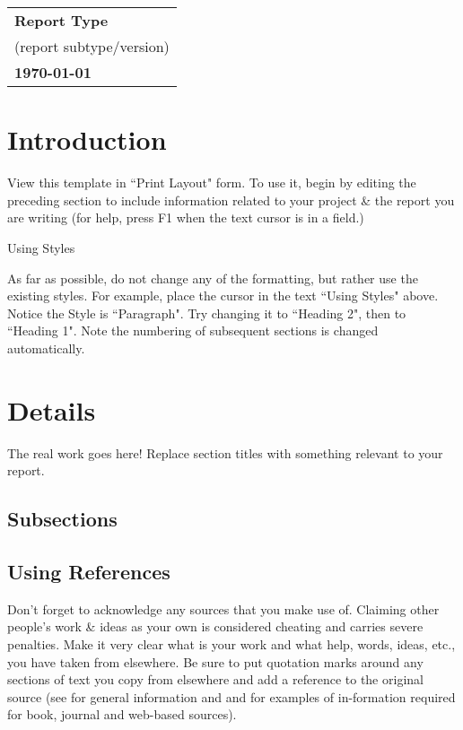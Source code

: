 \documentclass[a4paper, 12pt]{article}
\begin{document}
    \begin{table}[h!]
        \renewcommand{\arraystretch}{1.5}
        \centering
        \begin{tabular}{ |>{\centering\arraybackslash}m{15.15cm}| }
            \hline
            \Large \textbf{Report Type} \\
            \small (report subtype/version) \\
            \small \textbf{\today} \\
            \hline
        \end{tabular}
    \end{table}
    
    
    \section{Introduction}
    
    View this template in ``Print Layout" form. To use it, begin by editing 
    the preceding section to include information related to your project \& 
    the report you are writing (for help, press F1 when the text cursor is 
    in a field.) 
    
    Using Styles
    
    As far as possible, do not change any of the formatting, but rather use the 
    existing styles. For example, place the cursor in the text ``Using Styles" 
    above. Notice the Style is ``Paragraph". Try changing it to ``Heading 2", then to 
    ``Heading 1". Note the numbering of subsequent sections is changed automatically.
    
    \section{Details}
    
    The real work goes here! Replace section titles with something relevant to your report.
    
    \subsection{Subsections}
    
    \subsection{Using References}
    
    Don’t forget to acknowledge any sources that you make use of. Claiming other 
    people's work \& ideas as your own is considered cheating and carries severe 
    penalties. Make it very clear what is your work and what help, words, ideas, etc., 
    you have taken from elsewhere. Be sure to put quotation marks around any sections 
    of text you copy from elsewhere and add a reference to the original source 
    (see \cite{plagiarism} for general information and \cite{note1} and \cite{note2} for examples of in-formation 
    required for book, journal and web-based sources). 
    
\end{document}
